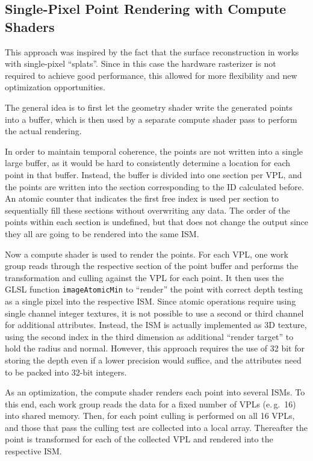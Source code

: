  \subsection{Single-Pixel Point Rendering with Compute Shaders}

 This approach was inspired by the fact that the surface reconstruction in \cite{Marroquim:2007:reconstruction} works with single-pixel ``splats''. Since in this case the hardware rasterizer is not required to achieve good performance, this allowed for more flexibility and new optimization opportunities.

 The general idea is to first let the geometry shader write the generated points into a buffer, which is then used by a separate compute shader pass to perform the actual rendering.

 In order to maintain temporal coherence, the points are not written into a single large buffer, as it would be hard to consistently determine a location for each point in that buffer. Instead, the buffer is divided into one section per VPL, and the points are written into the section corresponding to the ID calculated before. An atomic counter that indicates the first free index is used per section to sequentially fill these sections without overwriting any data. The order of the points within each section is undefined, but that does not change the output since they all are going to be rendered into the same ISM.

 Now a compute shader is used to render the points. For each VPL, one work group reads through the respective section of the point buffer and performs the transformation and culling against the VPL for each point. It then uses the GLSL function \texttt{imageAtomicMin} to ``render'' the point with correct depth testing as a single pixel into the respective ISM. Since atomic operations require using single channel integer textures, it is not possible to use a second or third channel for additional attributes. Instead, the ISM is actually implemented as 3D texture, using the second index in the third dimension as additional ``render target'' to hold the radius and normal. However, this approach requires the use of 32 bit for storing the depth even if a lower precision would suffice, and the attributes need to be packed into 32-bit integers.

 As an optimization, the compute shader renders each point into several ISMs. To this end, each work group reads the data for a fixed number of VPLs (e.\,g.\ 16) into shared memory. Then, for each point culling is performed on all 16 VPLs, and those that pass the culling test are collected into a local array. Thereafter the point is transformed for each of the collected VPL and rendered into the respective ISM.

